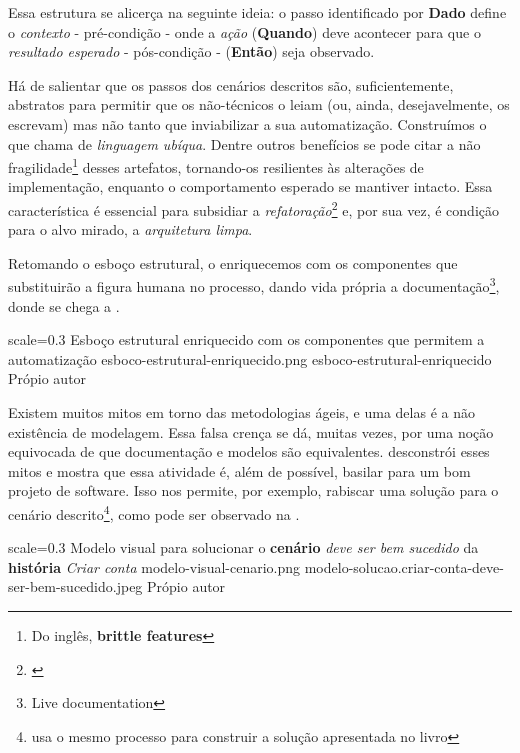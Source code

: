   Essa estrutura se alicerça na seguinte ideia: o passo identificado por \textbf{Dado} define o \emph{contexto} - pré-condição - onde a \emph{ação} (\textbf{Quando}) deve acontecer para que o \emph{resultado esperado} - pós-condição - (\textbf{Então}) seja observado.

  Há de salientar que os passos dos cenários descritos são, suficientemente, abstratos para permitir que os não-técnicos o leiam (ou, ainda, desejavelmente, os escrevam) mas não tanto que inviabilizar a sua automatização. Construímos o que  chama de \emph{linguagem ubíqua}. Dentre outros benefícios se pode citar a não fragilidade\footnote{\cite[pág. 93]{RoseWynneHellesoy2015} Do inglês, \textbf{brittle features}} desses artefatos, tornando-os resilientes às alterações de implementação, enquanto o comportamento esperado se mantiver intacto. Essa característica é essencial para subsidiar a \emph{refatoração}\footnote{\cite{Fowler1999}} e, por sua vez, é condição para o alvo mirado, a \emph{arquitetura limpa}.

  Retomando o esboço estrutural, o enriquecemos com os componentes que substituirão a figura humana no processo, dando vida própria a documentação\footnote{ Live documentation}, donde se chega a .

  \imagem
    {scale=0.3}
    {Esboço estrutural enriquecido com os componentes que permitem a automatização}
    {esboco-estrutural-enriquecido.png}
    {esboco-estrutural-enriquecido}
    {Própio autor}

  Existem muitos mitos em torno das metodologias ágeis, e uma delas é a não existência de modelagem. Essa falsa crença se dá, muitas vezes, por uma noção equivocada de que documentação e modelos são equivalentes.  desconstrói esses mitos e mostra que essa atividade é, além de possível, basilar para um bom projeto de software. Isso nos permite, por exemplo, rabiscar uma solução para o cenário descrito\footnote{ usa o mesmo processo para construir a solução apresentada no livro}, como pode ser observado na .

  \imagem
    {scale=0.3}
    {Modelo visual para solucionar o \textbf{cenário} \emph{deve ser bem sucedido} da \textbf{história} \emph{Criar conta}}
    {modelo-visual-cenario.png}
    {modelo-solucao.criar-conta-deve-ser-bem-sucedido.jpeg}
    {Própio autor}

